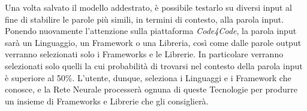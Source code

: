 Una volta salvato il modello addestrato, è possibile testarlo su diversi input al fine di stabilire le parole più simili, in termini di contesto, alla parola input. Ponendo nuovamente l'attenzione sulla piattaforma \emph{Code4Code}, la parola input sarà un Linguaggio, un Framework o una Libreria, così come dalle parole output verranno selezionati solo i Frameworks e le Librerie. In particolare verranno selezionati solo quelli la cui probabilità di trovarsi nel contesto della parola input è superiore al 50\%. L'utente, dunque, seleziona i Linguaggi e i Framework che conosce, e la Rete Neurale processerà ognuna di queste Tecnologie per produrre un insieme di Frameworks e Librerie che gli consiglierà.
\newpage
